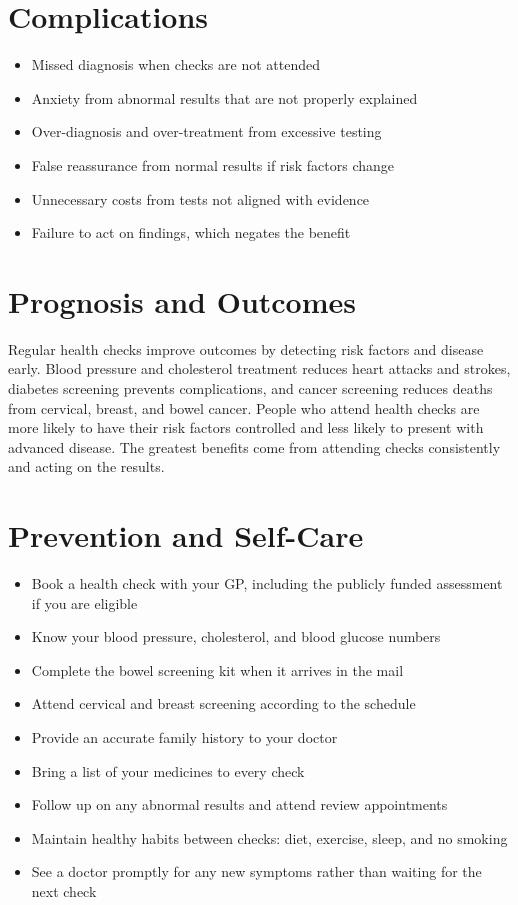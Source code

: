 \section*{Complications}
\begin{itemize}
    \item Missed diagnosis when checks are not attended
    \item Anxiety from abnormal results that are not properly explained
    \item Over-diagnosis and over-treatment from excessive testing
    \item False reassurance from normal results if risk factors change
    \item Unnecessary costs from tests not aligned with evidence
    \item Failure to act on findings, which negates the benefit
\end{itemize}

\section*{Prognosis and Outcomes}
Regular health checks improve outcomes by detecting risk factors and disease early. Blood pressure and cholesterol treatment reduces heart attacks and strokes, diabetes screening prevents complications, and cancer screening reduces deaths from cervical, breast, and bowel cancer. People who attend health checks are more likely to have their risk factors controlled and less likely to present with advanced disease. The greatest benefits come from attending checks consistently and acting on the results.

\section*{Prevention and Self-Care}
\begin{itemize}
    \item Book a health check with your GP, including the publicly funded assessment if you are eligible
    \item Know your blood pressure, cholesterol, and blood glucose numbers
    \item Complete the bowel screening kit when it arrives in the mail
    \item Attend cervical and breast screening according to the schedule
    \item Provide an accurate family history to your doctor
    \item Bring a list of your medicines to every check
    \item Follow up on any abnormal results and attend review appointments
    \item Maintain healthy habits between checks: diet, exercise, sleep, and no smoking
    \item See a doctor promptly for any new symptoms rather than waiting for the next check
\end{itemize}


